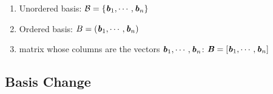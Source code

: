 \begin{enumerate}
    \item Unordered basis: $\mathcal{B} = \left\{\text{\textbf{\textit{b}}}_1, \cdots, \text{\textbf{\textit{b}}}_n\right\}$
    \hfill \cite{mfml/book/mml/Deisenroth-Faisal-Ong}

    \item Ordered basis: $B = (\text{\textbf{\textit{b}}}_1, \cdots, \text{\textbf{\textit{b}}}_n)$
    \hfill \cite{mfml/book/mml/Deisenroth-Faisal-Ong}

    \item matrix whose columns are the vectors $\text{\textbf{\textit{b}}}_1, \cdots, \text{\textbf{\textit{b}}}_n$: $\text{\textbf{\textit{B}}} = [\text{\textbf{\textit{b}}}_1, \cdots, \text{\textbf{\textit{b}}}_n]$
    \hfill \cite{mfml/book/mml/Deisenroth-Faisal-Ong}
\end{enumerate}




\subsection{Basis Change}

